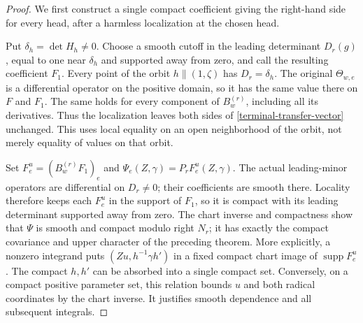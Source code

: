 \begin{proof}
We first construct a single compact coefficient giving the
right-hand side for every head, after a harmless localization
at the chosen head.

Put $\delta_h=\det H_h\ne0$.  Choose a smooth cutoff in
the leading determinant $D_r(g)$, equal to one near
$\delta_h$ and supported away from zero, and call the
resulting coefficient $F_1$.  Every point of the orbit
$h\mathbin{\|}(1,\zeta)$ has $D_r=\delta_h$.
The original $\Theta_{w,e}$ is a differential operator on
the positive domain, so it has the same value there on
$F$ and $F_1$.  The same holds for every component of
$B_w^{(r)}$, including all its derivatives.  Thus the
localization leaves both sides of
\eqref{terminal-transfer-vector} unchanged.  This uses
local equality on an open neighborhood of the orbit,
not merely equality of values on that orbit.

Set $F_e^u=(B_w^{(r)}F_1)_e$ and
$\Psi_e(Z,\gamma)=P_rF_e^u(Z,\gamma)$.
The actual leading-minor operators are differential on
$D_r\ne0$; their coefficients are smooth there.  Locality
therefore keeps each $F_e^u$ in the support of $F_1$, so it
is compact with its leading determinant supported away
from zero.  The chart inverse and compactness show that
$\Psi$ is smooth and compact modulo right $N_r$; it has
exactly the compact covariance and upper character of the
preceding theorem.  More explicitly, a nonzero integrand
puts $(Zu,h^{-1}\gamma h')$ in a fixed compact chart image
of $\operatorname{supp}F_e^u$.  The compact $h,h'$ can be
absorbed into a single compact set.  Conversely, on a
compact positive parameter set, this relation bounds $u$
and both radical coordinates by the chart inverse.  It
justifies smooth dependence and all subsequent integrals.


\end{proof}
